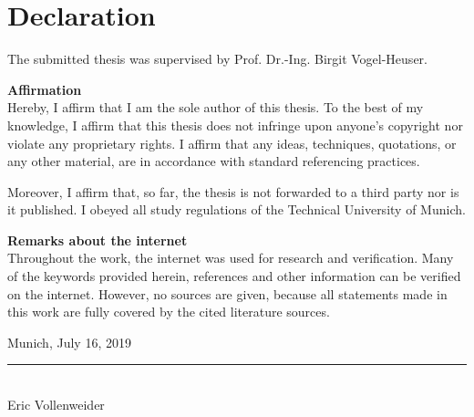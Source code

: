 \chapter*{Declaration}
\thispagestyle{plain}
%
The submitted thesis was supervised by Prof. Dr.-Ing. Birgit Vogel-Heuser.
\vspace{1cm}

\textbf{Affirmation}\\
Hereby, I affirm that I am the sole author of this thesis. To the best of my knowledge, I affirm that this thesis does not infringe upon anyone's copyright nor violate any proprietary rights. I affirm that any ideas, techniques, quotations, or any other material, are in accordance with standard referencing practices.

Moreover, I affirm that, so far, the thesis is not forwarded to a third party nor is it published. I obeyed all study regulations of the Technical University of Munich.

\vspace{1cm}

\textbf{Remarks about the internet}\\
Throughout the work, the internet was used for research and verification. Many of the keywords provided herein, references and other information can be verified on the internet. However, no sources are given, because all statements made in this work are fully covered by the cited literature sources.

\vspace*{2.5cm}
\hspace*{1cm} Munich, July 16, 2019
\hspace*{3cm}\rule[-3pt]{5cm}{1pt} \hspace*{2cm}\\
\hspace*{9.3cm} Eric Vollenweider
